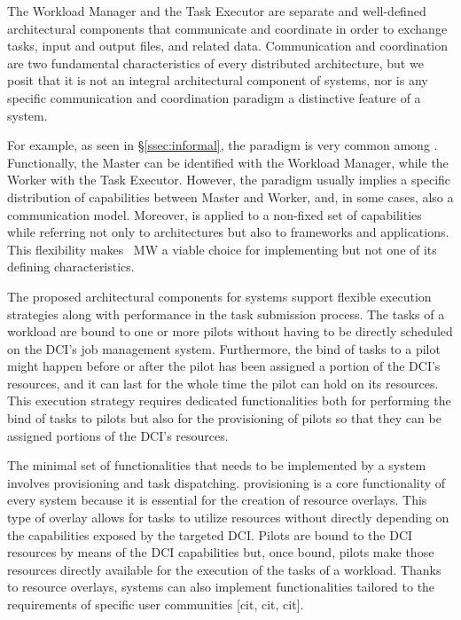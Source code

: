 \documentclass{sig-alternate}
\begin{document}
The Workload Manager and the Task Executor are separate and well-defined
architectural components that communicate and coordinate in order to exchange
tasks, input and output files, and related data. Communication and
coordination are two fundamental characteristics of every distributed
architecture, but we posit that it is not an integral architectural component
of \pilotjob systems, nor is any specific communication and coordination
paradigm a distinctive feature of a \pilotjob system.

For example, as seen in \S\ref{ssec:informal}, the \MW paradigm is very common
among \pilotjobs. Functionally, the Master can be identified with the Workload
Manager, while the Worker with the Task Executor. However, the \MW paradigm
usually implies a specific distribution of capabilities between Master and
Worker, and, in some cases, also a communication model. Moreover, \MW is
applied to a non-fixed set of capabilities while referring not only to
architectures but also to frameworks and applications. This flexibility makes \
MW a viable choice for implementing \pilotjobs but not one of its defining
characteristics.

The proposed architectural components for \pilotjob systems support flexible
execution strategies along with performance in the task submission process.
The tasks of a workload are bound to one or more pilots without having to be
directly scheduled on the DCI's job management system. Furthermore, the bind
of tasks to a pilot might happen before or after the pilot has been assigned a
portion of the DCI's resources, and it can last for the whole time the pilot
can hold on its resources. This execution strategy requires dedicated
functionalities both for performing the bind of tasks to pilots but also for
the provisioning of pilots so that they can be assigned portions of the DCI's
resources.


The minimal set of functionalities that needs to be implemented by a \pilotjob
system involves \pilot provisioning and task dispatching. \pilot provisioning
is a core functionality of every \pilot system because it is essential for the
creation of resource overlays. This type of overlay allows for tasks to
utilize resources without directly depending on the capabilities exposed by
the targeted DCI. Pilots are bound to the DCI resources by means of the DCI
capabilities but, once bound, pilots make those resources directly available
for the execution of the tasks of a workload. Thanks to resource overlays,
\pilot systems can also implement functionalities tailored to the requirements
of specific user communities [cit, cit, cit].
\end{document}
